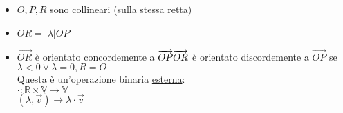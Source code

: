 \documentclass{article}
\newcommand{\ul}[1]{\underline{#1}}
\newcommand{\R}{\mathbb{R}}
\newcommand{\V}{\mathbb{V}}
\begin{document}
\begin{itemize}
\begin{itemize}
			      \item $O,P,R$ sono collineari (sulla stessa retta)
			      \item $\overline{OR}=|\lambda|\overline{OP}$
			      \item $\overrightarrow{OR}$ è orientato concordemente a $\overrightarrow{OP}\\\overrightarrow{OR}$ è orientato discordemente a $\overrightarrow{OP}$ se\\
			            $\lambda<0\vee\lambda=0,R=O$\\
			            Questa è un'operazione binaria \ul{esterna}:\\
			            $\cdot:\R\times\V\rightarrow \V$\\
			            \hspace*{1.5em}$(\lambda,\overrightarrow{v})\rightarrow\lambda\cdot\overrightarrow{v}$
		      \end{itemize}
	\end{itemize}
\end{document}
